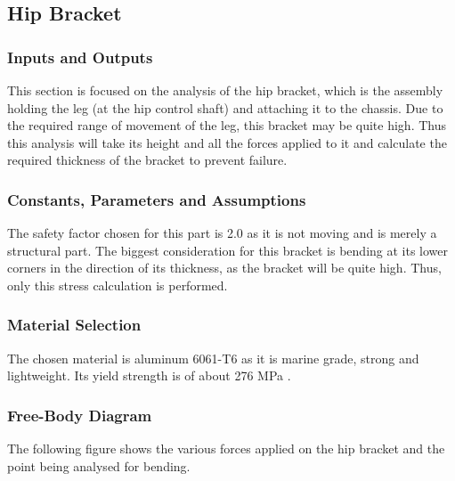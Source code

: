\subsection{Hip Bracket} \label{subsec:hipbracket}

\subsubsection{Inputs and Outputs}
This section is focused on the analysis of the hip bracket, which is the assembly holding the leg (at the hip control shaft) and attaching it to the chassis. Due to the required range of movement of the leg, this bracket may be quite high. Thus this analysis will take its height and all the forces applied to it and calculate the required thickness of the bracket to prevent failure. 

\subsubsection{Constants, Parameters and Assumptions}
The safety factor chosen for this part is 2.0 as it is not moving and is merely a structural part. 
The biggest consideration for this bracket is bending at its lower corners in the direction of its thickness, as the bracket will be quite high. Thus, only this stress calculation is performed. 

\subsubsection{Material Selection}
The chosen material is aluminum 6061-T6 as it is marine grade, strong and lightweight. Its yield strength is of about 276 MPa \cite{matweb_aluminum_nodate}.

\subsubsection{Free-Body Diagram}
The following figure shows the various forces applied on the hip bracket and the point being analysed for bending. 

